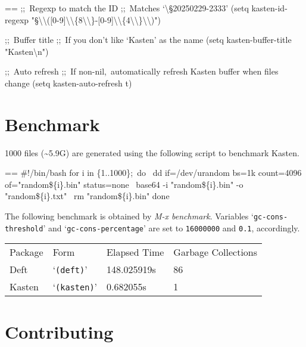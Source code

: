 \documentclass{book}
\makeatletter
\newcommand\Texinfocommandstyletextkbd[1]{{\ttfamily\textsl{#1}}}%
\newenvironment{Texinfopreformatted}{%
  \par\GNUTobeylines\obeyspaces\frenchspacing\parskip=\z@\parindent=\z@}{}
{\catcode`\^^M=13 \gdef\GNUTobeylines{\catcode`\^^M=13 \def^^M{\null\par}}}
\newenvironment{Texinfoindented}{\begin{list}{}{}\item\relax}{\end{list}}
\renewcommand{\_}{\Texinfounderscore\discretionary{}{}{}}
\makeatother
\begin{document}
\begin{Texinfoindented}
\begin{Texinfopreformatted}
;;\ Regexp to match the ID
;;\ Matches `\textbackslash{}§20250229-2333'
(setq kasten-id-regexp "§\textbackslash{}\textbackslash{}([0-9]\textbackslash{}\textbackslash{}\{8\textbackslash{}\textbackslash{}\}-[0-9]\textbackslash{}\textbackslash{}\{4\textbackslash{}\textbackslash{}\}\textbackslash{}\textbackslash{})")

;;\ Buffer title
;;\ If you don't like `Kasten' as the name
(setq kasten-buffer-title "Kasten\textbackslash{}n")

;;\ Auto refresh
;;\ If non-nil,\ automatically refresh Kasten buffer when files change
(setq kasten-auto-refresh t)
\end{Texinfopreformatted}
\end{Texinfoindented}

\chapter{{Benchmark}}
\label{anchor:Benchmark}%

1000 files (\~{}5.9G) are generated using the following script to benchmark Kasten.

\begin{Texinfoindented}
\begin{Texinfopreformatted}%
\ttfamily \#!/bin/bash
for i in \{1..1000\};\ do
\    dd if=/dev/urandom bs=1k count=4096 of="random\_\$\{i\}.bin" status=none
\    base64 -i "random\_\$\{i\}.bin" -o "random\_\$\{i\}.txt"
\    rm "random\_\$\{i\}.bin"
done
\end{Texinfopreformatted}
\end{Texinfoindented}

The following benchmark is obtained by \Texinfocommandstyletextkbd{M-x benchmark}. Variables
`\texttt{gc-cons-threshold}' and `\texttt{gc-cons-percentage}' are set to \texttt{16000000} and \texttt{0.1},
accordingly.

\begin{tabular}{m{} m{} m{} m{}}%
Package&
Form&
Elapsed Time&
Garbage Collections\\
Deft&
`\texttt{(deft)}'&
148.025919s&
86\\
Kasten&
`\texttt{(kasten)}'&
0.682055s&
1\\
\end{tabular}%

\chapter{{Contributing}}
\label{anchor:Contributing}%
\end{document}
